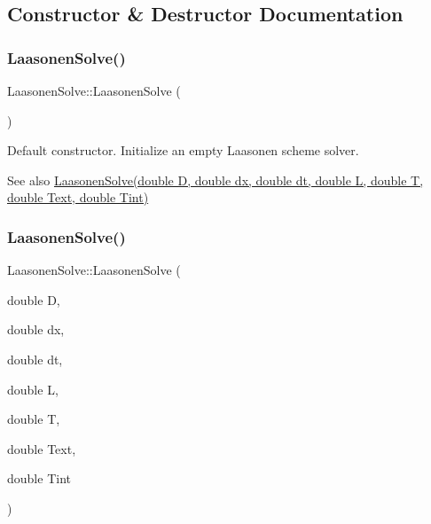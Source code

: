 \subsection{Constructor \& Destructor Documentation}
\mbox{\label{class_laasonen_solve_ab71dba8e7f61306851762f35cce40e53}} 
\subsubsection{\texorpdfstring{Laasonen\+Solve()}{LaasonenSolve()}\hspace{0.1cm}{\footnotesize\ttfamily [1/2]}}
{\footnotesize\ttfamily Laasonen\+Solve\+::\+Laasonen\+Solve (\begin{DoxyParamCaption}{ }\end{DoxyParamCaption})\hspace{0.3cm}{\ttfamily [inline]}}

Default constructor. Initialize an empty Laasonen scheme solver. \begin{DoxySeeAlso}{See also}
\hyperlink{class_laasonen_solve_afee5334bc58eaf72c312d73ff3e8829c}{Laasonen\+Solve(double D, double dx, double dt, double L, double T, double Text, double Tint)} 
\end{DoxySeeAlso}
\mbox{\label{class_laasonen_solve_afee5334bc58eaf72c312d73ff3e8829c}} 
\subsubsection{\texorpdfstring{Laasonen\+Solve()}{LaasonenSolve()}\hspace{0.1cm}{\footnotesize\ttfamily [2/2]}}
{\footnotesize\ttfamily Laasonen\+Solve\+::\+Laasonen\+Solve (\begin{DoxyParamCaption}\item[{double}]{D,  }\item[{double}]{dx,  }\item[{double}]{dt,  }\item[{double}]{L,  }\item[{double}]{T,  }\item[{double}]{Text,  }\item[{double}]{Tint }\end{DoxyParamCaption})\hspace{0.3cm}{\ttfamily [inline]}}

